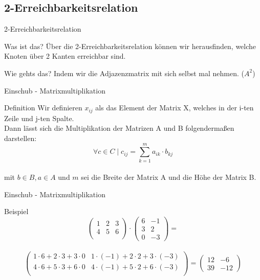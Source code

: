 	
	\subsection{2-Erreichbarkeitsrelation}
	\begin{frame}{2-Erreichbarkeitsrelation}
		\begin{block}{Was ist das?}
			Über die 2-Erreichbarkeitsrelation können wir herausfinden, welche Knoten über 2 Kanten erreichbar sind.
		\end{block}
		
		\pause
		\begin{block}{Wie gehts das?}
			Indem wir die Adjazenzmatrix mit sich selbst mal nehmen. ($A^2$)
		\end{block}
	\end{frame}
	
	
	\begin{frame}{Einschub - Matrixmultiplikation}
		\begin{block}{Definition}
			Wir definieren $x_{ij}$ als das Element der Matrix X, 
			welches in der i-ten Zeile und j-ten Spalte.\\
			
			Dann lässt sich die Multiplikation der Matrizen A und B 
			folgendermaßen darstellen:\\
		
			\[\forall c \in C \;|\; c_{ij} = \sum_{k=1}^m a_{ik} \cdot b_{kj}\]\\
			mit $b\in B, a\in A$ und $m$ sei die Breite der Matrix A 
			und die Höhe der Matrix B.
		
		\end{block}
	\end{frame}
	
	\begin{frame}{Einschub - Matrixmultiplikation}
		\begin{exampleblock}{Beispiel}
			\[\begin{pmatrix}
    			1 & 2 & 3 \\
    			4 & 5 & 6 \\
  			\end{pmatrix}
  			\cdot
  			\begin{pmatrix}
    			6 & -1 \\
    			3 & 2 \\
    			0 & -3
 			 \end{pmatrix}
  			=\]\\
  			\[
  			\begin{pmatrix}
     			1 \cdot 6  +  2 \cdot 3  +  3 \cdot 0 &
     			1 \cdot (-1) +  2 \cdot 2 +  3 \cdot (-3) \\
     			4 \cdot 6  +  5 \cdot 3  +  6 \cdot 0 &
     			4 \cdot (-1) +  5 \cdot 2 +  6 \cdot (-3) \\
  			\end{pmatrix}
  			=
  			\begin{pmatrix}
    			12 & -6 \\
    			39 & -12
  			\end{pmatrix}\]
		\end{exampleblock}
	\end{frame}
	
